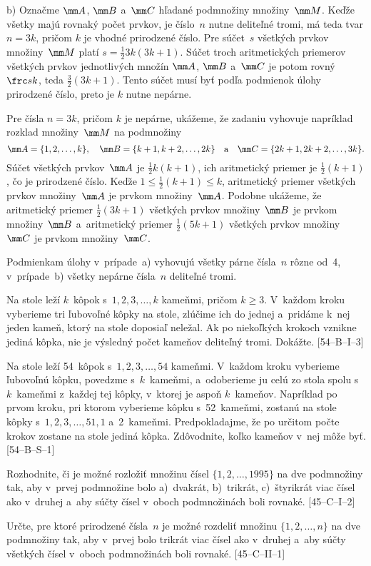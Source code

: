 {\medskip
b) Označme $\mm A$, $\mm B$ a~$\mm C$ hľadané podmnožiny množiny~$\mm M$. Keďže
všetky majú rovnaký počet prvkov, je číslo~$n$ nutne deliteľné
tromi, má teda tvar $n=3k$, pričom $k$ je vhodné prirodzené
číslo. Pre súčet~$s$ všetkých prvkov množiny~$\mm M$ platí $s=\frac12
3k(3k+1)$. Súčet troch aritmetických priemerov všetkých prvkov
jednotlivých množín $\mm A$, $\mm B$ a~$\mm C$ je potom rovný $\frc sk$, teda
$\frac32 (3k+1)$. Tento súčet musí byť podľa podmienok úlohy
prirodzené číslo, preto je $k$ nutne nepárne.

Pre čísla $n=3k$, pričom $k$ je nepárne, ukážeme, že zadaniu vyhovuje
napríklad rozklad množiny~$\mm M$ na podmnožiny
$$
\mm A=\{1,2,\dots,k\},\quad  \mm B=\{k+1,k+2,\dots,2k\}\quad
\text{a}\quad   \mm C=\{2k+1,2k+2,\dots,3k\}.
$$
Súčet všetkých prvkov~$\mm A$ je $\frac12k(k+1)$, ich aritmetický priemer je
$\frac12(k+1)$, čo je prirodzené číslo. Keďže $1\le\frac12(k+1)\le
k$, aritmetický priemer všetkých prvkov množiny~$\mm A$ je prvkom množiny~$\mm A$.
Podobne ukážeme, že aritmetický priemer $\frac12(3k+1)$ všetkých
prvkov množiny~$\mm B$ je prvkom množiny~$\mm B$ a~aritmetický priemer
$\frac12(5k+1)$ všetkých prvkov množiny~$\mm C$ je prvkom množiny~$\mm C$.

\zaver
Podmienkam úlohy v~prípade~a) vyhovujú všetky párne čísla~$n$
rôzne od~4, v~prípade~b) všetky nepárne čísla~$n$ deliteľné tromi.


Na stole leží $k$~kôpok s~$1,2,3,\dots,k$ kameňmi, pričom $k\ge 3$.
V~každom kroku vyberieme tri ľubovoľné kôpky na stole,
zlúčime ich do jednej a~pridáme k~nej jeden kameň, ktorý na stole
doposiaľ neležal. Ak po niekoľkých krokoch vznikne jediná
kôpka, nie je výsledný počet kameňov deliteľný tromi. Dokážte.
[54--B--I--3]

Na stole leží 54~kôpok s~$1,2,3,\dots,54$ kameňmi. V~každom
kroku vyberieme ľubovoľnú kôpku, povedzme s~$k$~kameňmi,  
a~odoberieme ju celú zo stola spolu s~$k$~kameňmi z~každej tej kôpky,
v~ktorej je aspoň $k$~kameňov. Napríklad po prvom kroku, pri ktorom
vyberieme kôpku s~52~kameňmi, zostanú na stole kôpky s~$1,2,3,\dots,51,1$ a~2~kameňmi.
Predpokladajme, že po určitom
počte krokov zostane na stole jediná kôpka. Zdôvodnite, koľko
kameňov v~nej môže byť. [54--B--S--1]

Rozhodnite, či je možné rozložiť množinu čísel
$\{1,2,\dots,1995\}$ na dve podmnožiny tak, aby v~prvej
podmnožine bolo a)~dvakrát, b)~trikrát, c)~štyrikrát viac čísel ako
v~druhej a~aby súčty čísel v~oboch podmnožinách boli rovnaké.
[45--C--I--2]

Určte, pre ktoré prirodzené čísla~$n$ je možné rozdeliť množinu
$\{1,2,\dots,n\}$ na dve podmnožiny tak, aby v~prvej bolo trikrát
viac čísel ako v~druhej a~aby súčty všetkých čísel v~oboch
podmnožinách boli rovnaké. [45--C--II--1]

}

